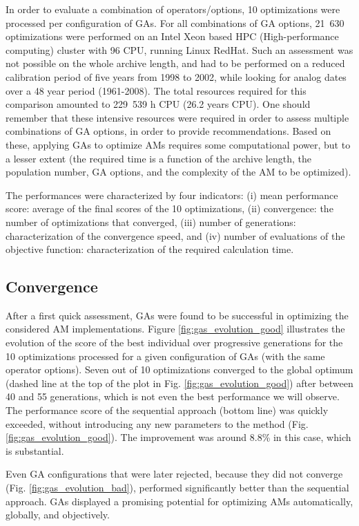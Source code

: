 \documentclass{ametsoc}
\begin{document}
In order to evaluate a combination of operators/options, 10 optimizations were processed per configuration of GAs. For all combinations of GA options, 21~630 optimizations were performed on an Intel Xeon based HPC (High-performance computing) cluster with 96 CPU, running Linux RedHat. Such an assessment was not possible on the whole archive length, and had to be performed on a reduced calibration period of five years from 1998 to 2002, while looking for analog dates over a 48 year period (1961-2008). The total resources required for this comparison amounted to 229~539 h CPU (26.2 years CPU). One should remember that these intensive resources were required in order to assess multiple combinations of GA options, in order to provide recommendations. Based on these, applying GAs to optimize AMs requires some computational power, but to a lesser extent (the required time is a function of the archive length, the population number, GA options, and the complexity of the AM to be optimized). 

The performances were characterized by four indicators: (i) mean performance score: average of the final scores of the 10 optimizations, (ii) convergence: the number of optimizations that converged, (iii) number of generations: characterization of the convergence speed, and (iv) number of evaluations of the objective function: characterization of the required calculation time.


\subsection{Convergence}

After a first quick assessment, GAs were found to be successful in optimizing the considered AM implementations. Figure \ref{fig:gas_evolution_good} illustrates the evolution of the score of the best individual over progressive generations for the 10 optimizations processed for a given configuration of GAs (with the same operator options). Seven out of 10 optimizations converged to the global optimum (dashed line at the top of the plot in Fig. \ref{fig:gas_evolution_good}) after between 40 and 55 generations, which is not even the best performance we will observe. The performance score of the sequential approach (bottom line) was quickly exceeded, without introducing any new parameters to the method (Fig. \ref{fig:gas_evolution_good}). The improvement was around 8.8\% in this case, which is substantial.

Even GA configurations that were later rejected, because they did not converge (Fig. \ref{fig:gas_evolution_bad}), performed significantly better than the sequential approach. GAs displayed a promising potential for optimizing AMs automatically, globally, and objectively.
\end{document}
